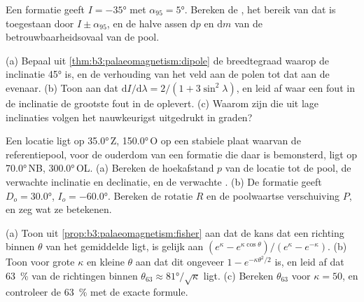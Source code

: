 \begin{exercise}[$\star\star$]\label{exo:b3:palaeomagnetism:9}
Een formatie geeft $I = \ang{-35}$ met $\alpha_{95} = \ang{5}$. Bereken de
, het bereik van  dat is toegestaan door $I \pm \alpha_{95}$,
en de halve assen $\mathrm dp$ en $\mathrm dm$ van de betrouwbaarheidsovaal van de
pool.
\end{exercise}

\begin{exercise}[$\star\star\star$]\label{exo:b3:palaeomagnetism:10}
(a) Bepaal uit \cref{thm:b3:palaeomagnetism:dipole} de breedtegraad waarop
de inclinatie \ang{45} is, en de verhouding van het veld aan de polen tot dat aan de
evenaar. (b) Toon aan dat $\mathrm dI/\mathrm d\lambda = 2/(1 + 3\sin^2\lambda)$,
en leid af waar een fout in de inclinatie de grootste fout in de
 oplevert. (c) Waarom zijn  die uit lage inclinaties volgen het
nauwkeurigst uitgedrukt in graden?
\end{exercise}

\begin{exercise}[$\star\star\star$]\label{exo:b3:palaeomagnetism:11}
Een locatie ligt op \ang{35.0}\,Z, \ang{150.0}\,O op een stabiele plaat waarvan
de referentiepool, voor de ouderdom van een formatie die daar is bemonsterd, ligt op \ang{70.0}\,NB,
\ang{300.0}\,OL. (a) Bereken de hoekafstand $p$ van de locatie tot de pool,
de verwachte inclinatie en declinatie, en de verwachte .
(b) De formatie geeft $D_o = \ang{30.0}$, $I_o = \ang{-60.0}$. Bereken de
rotatie $R$ en de poolwaartse verschuiving $P$, en zeg wat ze betekenen.
\end{exercise}

\begin{exercise}[$\star\star\star$]\label{exo:b3:palaeomagnetism:12}
(a) Toon uit \cref{prop:b3:palaeomagnetism:fisher} aan dat de kans dat
een richting binnen $\theta$ van het gemiddelde ligt, is gelijk aan $(e^\kappa -
e^{\kappa\cos\theta})/(e^\kappa - e^{-\kappa})$. (b) Toon voor grote $\kappa$ en
kleine $\theta$ aan dat dit ongeveer $1 - e^{-\kappa\theta^2/2}$ is, en leid af dat
\qty{63}{\percent} van de richtingen binnen $\theta_{63} \approx
\ang{81}/\sqrt\kappa$ ligt. (c) Bereken $\theta_{63}$ voor $\kappa = 50$, en controleer de
\qty{63}{\percent} met de exacte formule.
\end{exercise}

